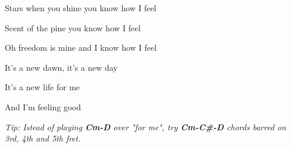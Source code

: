 \begin{song}
\bigskip

 Stars when you shine  you know how I feel \par
{} Scent of the pine  you know how I feel \par
Oh freedom is mine and I know how I feel \par
It's a new dawn, it's a new day \par
It's a new life  for me  \par
And I'm feeling good    \par
{} \par

\bigskip

\bigskip

{
\smaller\it Tip: Istead of playing \textbf{Cm-D} over "for me", try \textbf{Cm-C\#-D} chords barred on 3rd, 4th and 5th fret.
}

\end{song}